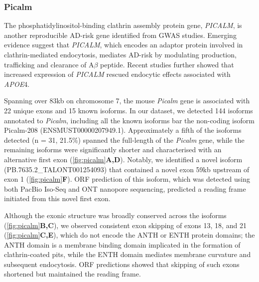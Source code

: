 \newpage
\subsubsection{Picalm}
The phosphatidylinositol-binding clathrin assembly protein gene, \textit{PICALM}, is another reproducible AD-risk gene identified from GWAS studies. Emerging evidence suggest that \textit{PICALM}, which encodes an adaptor protein involved in clathrin-mediated endocytosis,  mediates AD-risk by modulating production, trafficking and clearance of A$\beta$ peptide\cite{Ando2016}. Recent studies further showed that increased expression of \textit{PICALM} rescued endocytic effects associated with \textit{APOE}4\cite{Narayan2020}.

Spanning over 83kb on chromosome 7, the mouse \textit{Picalm} gene is associated with 22 unique exons and 15 known isoforms. In our dataset, we detected 144 isoforms annotated to \textit{Picalm}, including all the known isoforms bar the non-coding isoform Picalm-208 (ENSMUST00000207949.1). Approximately a fifth of the isoforms detected (n = 31, 21.5\%) spanned the full-length of the \textit{Picalm} gene, while the remaining isoforms were significantly shorter and characterised with an alternative first exon (\cref{fig:picalm}\textbf{A,D}). Notably, we identified a novel isoform (PB.7635.2\_TALONT001254093) that contained a novel exon 59kb upstream of exon 1 (\cref{fig:picalm}\textbf{F}). ORF prediction of this isoform, which was detected using both PacBio Iso-Seq and ONT nanopore sequencing, predicted a reading frame initiated from this novel first exon.  

Although the exonic structure was broadly conserved across the isoforms (\cref{fig:picalm}\textbf{B,C}), we observed consistent exon skipping of exons 13, 18, and 21 (\cref{fig:picalm}\textbf{C,E}), which do not encode the ANTH or ENTH protein domains; the ANTH domain is a membrane binding domain implicated in the formation of clathrin-coated pits, while the ENTH domain mediates membrane curvature and subsequent endocytosis. ORF predictions showed that skipping of such exons shortened but maintained the reading frame. 


